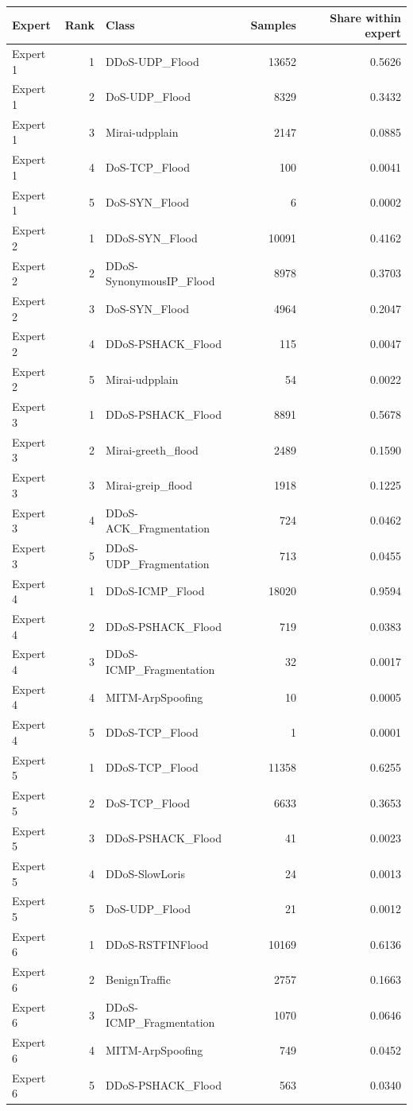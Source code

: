 \begin{tabular}{lrlrr}
\toprule
Expert & Rank & Class & Samples & Share within expert \\
\midrule
Expert 1 & 1 & DDoS-UDP\_Flood & 13652 & 0.5626 \\
Expert 1 & 2 & DoS-UDP\_Flood & 8329 & 0.3432 \\
Expert 1 & 3 & Mirai-udpplain & 2147 & 0.0885 \\
Expert 1 & 4 & DoS-TCP\_Flood & 100 & 0.0041 \\
Expert 1 & 5 & DoS-SYN\_Flood & 6 & 0.0002 \\
Expert 2 & 1 & DDoS-SYN\_Flood & 10091 & 0.4162 \\
Expert 2 & 2 & DDoS-SynonymousIP\_Flood & 8978 & 0.3703 \\
Expert 2 & 3 & DoS-SYN\_Flood & 4964 & 0.2047 \\
Expert 2 & 4 & DDoS-PSHACK\_Flood & 115 & 0.0047 \\
Expert 2 & 5 & Mirai-udpplain & 54 & 0.0022 \\
Expert 3 & 1 & DDoS-PSHACK\_Flood & 8891 & 0.5678 \\
Expert 3 & 2 & Mirai-greeth\_flood & 2489 & 0.1590 \\
Expert 3 & 3 & Mirai-greip\_flood & 1918 & 0.1225 \\
Expert 3 & 4 & DDoS-ACK\_Fragmentation & 724 & 0.0462 \\
Expert 3 & 5 & DDoS-UDP\_Fragmentation & 713 & 0.0455 \\
Expert 4 & 1 & DDoS-ICMP\_Flood & 18020 & 0.9594 \\
Expert 4 & 2 & DDoS-PSHACK\_Flood & 719 & 0.0383 \\
Expert 4 & 3 & DDoS-ICMP\_Fragmentation & 32 & 0.0017 \\
Expert 4 & 4 & MITM-ArpSpoofing & 10 & 0.0005 \\
Expert 4 & 5 & DDoS-TCP\_Flood & 1 & 0.0001 \\
Expert 5 & 1 & DDoS-TCP\_Flood & 11358 & 0.6255 \\
Expert 5 & 2 & DoS-TCP\_Flood & 6633 & 0.3653 \\
Expert 5 & 3 & DDoS-PSHACK\_Flood & 41 & 0.0023 \\
Expert 5 & 4 & DDoS-SlowLoris & 24 & 0.0013 \\
Expert 5 & 5 & DoS-UDP\_Flood & 21 & 0.0012 \\
Expert 6 & 1 & DDoS-RSTFINFlood & 10169 & 0.6136 \\
Expert 6 & 2 & BenignTraffic & 2757 & 0.1663 \\
Expert 6 & 3 & DDoS-ICMP\_Fragmentation & 1070 & 0.0646 \\
Expert 6 & 4 & MITM-ArpSpoofing & 749 & 0.0452 \\
Expert 6 & 5 & DDoS-PSHACK\_Flood & 563 & 0.0340 \\
\bottomrule
\end{tabular}
